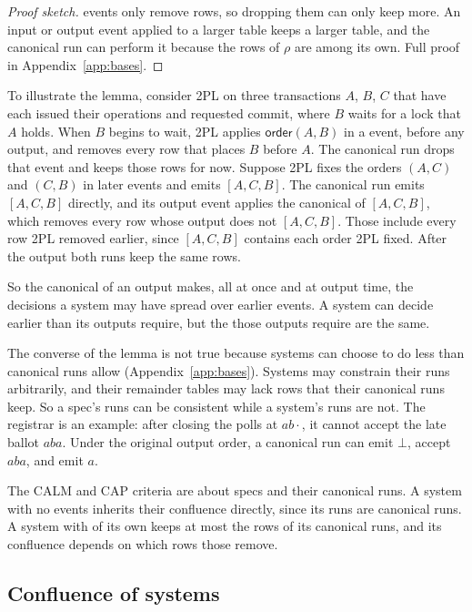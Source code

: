 \begin{proof}[Proof sketch]
\Commitment events only remove rows, so dropping them can only keep more.  An
input or output event applied to a larger table keeps a larger table, and the
canonical run can perform it because the rows of $\rho$ are among its
own.  Full proof in
Appendix~\ref{app:bases}.
\end{proof}

To illustrate the lemma, consider 2PL on three transactions $A$, $B$, $C$ that
have each issued their operations and requested commit, where $B$ waits for a
lock that $A$ holds.  When $B$ begins to wait, 2PL applies
$\mathsf{order}(A,B)$ in a \commitment event, before any output, and removes
every row that places $B$ before $A$.  The canonical run drops that event and
keeps those rows for now.  Suppose 2PL fixes the orders $(A,C)$ and $(C,B)$ in
later \commitment events and emits $[A,C,B]$.  The canonical run emits
$[A,C,B]$ directly, and its output event applies the canonical \commitment of
$[A,C,B]$, which removes every row whose output does not \outrelbase
$[A,C,B]$.  Those include every row 2PL removed earlier, since $[A,C,B]$
contains each order 2PL fixed.  After the output both runs keep the same rows.

So the canonical \commitment of an output makes, all at once and at output
time, the decisions a system may have spread over earlier \commitment events.
A system can decide earlier than its outputs require, but the \commitments
those outputs require are the same.

The converse of the lemma is not true because systems can choose to do less
than canonical runs allow (Appendix~\ref{app:bases}).  Systems may constrain their runs arbitrarily, and
their remainder tables may lack rows that their canonical runs keep.  So a spec's runs
can be consistent while a system's runs are not.  The registrar is an example:
after closing the polls at $ab\cdot$, it cannot accept the late ballot $aba$.
Under the original output order, a canonical run can emit $\bot$, accept
$aba$, and emit $a$.

The CALM and CAP criteria are about specs and
their canonical runs.  A system with no \commitment events inherits their
confluence directly, since its runs are canonical runs.  A system with
\commitments of its own keeps at most the rows of its canonical runs, and its
confluence depends on which rows those \commitments remove.

\subsection{Confluence of systems}
\label{sec:commitment-conflict}

